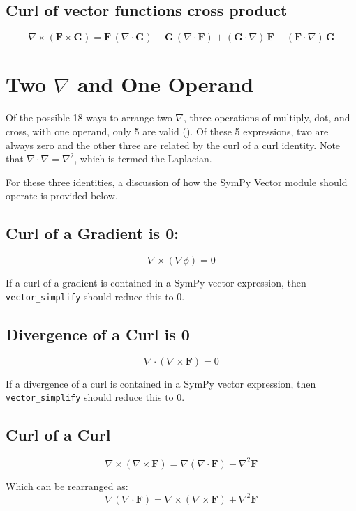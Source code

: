 \documentclass[12pt, titlepage]{article}
\newcommand{\code}[1]{\texttt{#1}}
\begin{document}
	\subsection{Curl of vector functions cross product}
	\[
	\nabla \times ({\mathbf{F}}\times {\mathbf{G}}) ={\mathbf{F}}\,(\nabla \cdot {\mathbf{G}})-{\mathbf{G}}\,(\nabla \cdot {\mathbf{F}})+({\mathbf{G}}\cdot \nabla )\,{\mathbf{F}}-({\mathbf{F}}\cdot \nabla )\,{\mathbf{G}}
	\]
	
	\section{Two \(\nabla\) and One Operand}
	Of the possible 18 ways to arrange two \(\nabla\), three operations of multiply, dot, and cross, with one operand, only 5 are valid (\cite{Lopez}).  Of these 5 expressions, two are always zero and the other three are related by the curl of a curl identity. Note that \(\nabla \cdot \nabla = \nabla^{2}\), which is termed the Laplacian.  
	
	For these three identities, a discussion of how the SymPy Vector module should operate is provided below.
	
	\subsection{Curl of a Gradient is 0:}
	\[ \nabla \times (\nabla \phi) =0 \]
	
	If a curl of a gradient is contained in a SymPy vector expression, then \code{vector\_simplify} should reduce this to 0. 
	
	\subsection{Divergence of a Curl is 0}
	\[ \nabla \cdot (\nabla \times \mathbf{F}) = 0 \]
	
	If a divergence of a curl is contained in a SymPy vector expression, then \code{vector\_simplify} should reduce this to 0. 
	
	\subsection{Curl of a Curl}
	\[
	\nabla \times \left(\nabla \times {\mathbf{F}}\right)=\nabla (\nabla \cdot {\mathbf{F}})-\nabla ^{2}{\mathbf{F}}
	\]
	
	Which can be rearranged as:
	\[
	\nabla (\nabla \cdot {\mathbf{F}}) = \nabla \times \left(\nabla \times {\mathbf{F}}\right)+\nabla ^{2}{\mathbf{F}}
	\]
	
\end{document}
